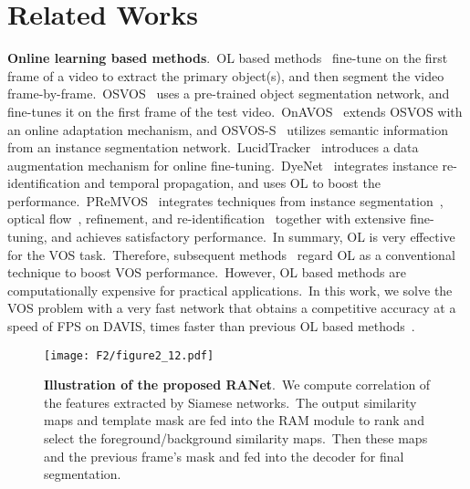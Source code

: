 \documentclass[10pt,twocolumn,letterpaper]{article}
\begin{document}
\section{Related Works}
\noindent
{\bf Online learning based methods}.\
OL based methods~\cite{osvos,onavos,masktrack,osvos-s,reid,lucid,premvos,premvos2,premvos3} fine-tune on the first frame of a video to extract the primary object(s), and then segment the video frame-by-frame.\ OSVOS~\cite{osvos} uses a pre-trained object segmentation network, and fine-tunes it on the first frame of the test video.\ OnAVOS~\cite{onavos} extends OSVOS with an online adaptation mechanism, and OSVOS-S~\cite{osvos-s} utilizes semantic information from an instance segmentation network.\ LucidTracker~\cite{lucid} introduces a data augmentation mechanism for online fine-tuning.\ DyeNet~\cite{reid} integrates instance re-identification and temporal propagation, and uses OL to boost the performance.\ PReMVOS~\cite{premvos,premvos2,premvos3} integrates techniques from instance segmentation~\cite{mask-rcnn}, optical flow~\cite{flownet,flownet2}, refinement, and re-identification~\cite{personsearch} together with extensive fine-tuning, and achieves satisfactory performance.\ In summary, OL is very effective for the VOS task.\ Therefore, subsequent methods~\cite{masktrack, cinm, reid} regard OL as a conventional technique to boost VOS performance.\ However, OL based methods are computationally expensive for practical applications.\ In this work, we solve the VOS problem with a very fast network that obtains a competitive accuracy at a speed of  FPS on DAVIS,  times faster than previous OL based methods~\cite{osvos, masktrack, osvos-s, onavos}.







\begin{figure*}[t]
\vspace{-5mm}
\begin{center}
\texttt{[image: F2/figure2\_12.pdf]}
\end{center}
\vspace{-7mm}
\caption{\textbf{Illustration of the proposed RANet}.\ We compute correlation of the features extracted by Siamese networks.\ The output similarity maps and template mask are fed into the RAM module to rank and select the foreground/background similarity maps.\ Then these maps and the previous frame's mask and fed into the decoder for final segmentation.}
\label{fig:our}
\vspace{-5mm}
\end{figure*}
\end{document}
